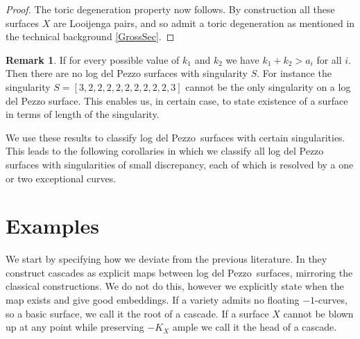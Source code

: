 \documentclass[12pt,a4paper]{book}      %
\newtheorem{cor}[thm]{Corollary}
\theoremstyle{definition}
\newtheorem*{rem}{Remark}
\newcommand{\ldp}{log del Pezzo}
\newcommand{\mb}[1]{\mathbb{#1}}
\newcommand{\LJ}{Looijenga pair}
\begin{document}
\begin{proof}
The toric degeneration property now follows. By construction all these surfaces $X$ are \LJ s,
and so admit a toric degeneration as mentioned in the technical background \ref{GrossSec}.
\end{proof}

\begin{rem}\rm
If for every possible value of $k_1$ and $k_2$ we have $k_1 + k_2 > a_i$ for all $i$. Then there are no log del Pezzo surfaces with singularity $S$. For instance the singularity $S = [3,2,2,2,2,2,2,2,2,2,3]$ cannot be the only singularity on a log del Pezzo surface. This enables us, in certain case, to state existence of a surface in terms of length of the singularity.
\end{rem}
\begin{comment}
\begin{cor}
Let $S$ be a singularity with small discrepancy, $-a_1, \dots , -a_n$ be the self-intersection of the resolutions. Then if $n \geq \max (a_i) + 5 $. Then there exists no \ldp\ with only singularities of type $S$.
\end{cor}
\end{comment}

We use these results to classify \ldp\ surfaces with certain singularities. This leads to the following corollaries in which we classify all log del Pezzo surfaces with singularities of small discrepancy, each of which is resolved by a one or two exceptional curves.
 
\section{Examples}
 
We start by specifying how we deviate from the previous literature. In \cite{ReidSuzuki} they construct cascades as explicit maps between \ldp\ surfaces, mirroring the classical constructions. We do not do this, however we explicitly state when the map exists and give good embeddings. If a variety admits no floating $-1$-curves, so a basic surface, we call it the root of a cascade. If a surface $X$ cannot be blown up at any point while preserving ${-}K_X$ ample we call it the head of a cascade. 
\end{document}
